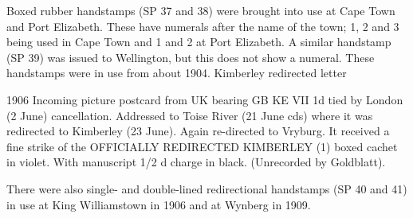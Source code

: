 Boxed rubber handstamps (SP 37 and 38) were brought into use at Cape Town and Port Elizabeth. 
These have numerals after the name of the town; 1, 2 and 3 being used in Cape Town and 1 and 2 at Port Elizabeth. A similar handstamp (SP 39) was issued to Wellington, but this does not show a numeral. These handstamps were in use from about 1904.
Kimberley redirected letter

1906 Incoming picture postcard from UK bearing 
GB KE VII 1d tied by London (2 June) cancellation. 
Addressed to Toise River (21 June cds) where it was 
redirected to Kimberley (23 June). Again re-directed to Vryburg. 
It received a fine strike of the
\textsc{OFFICIALLY REDIRECTED KIMBERLEY (1)}
boxed cachet in violet. With manuscript 
1/2 d charge in black. (Unrecorded by Goldblatt).

There were also single- and double-lined redirectional 
handstamps (SP 40 and 41) 
in use at King Williamstown in 1906 and at Wynberg in 1909.
                      